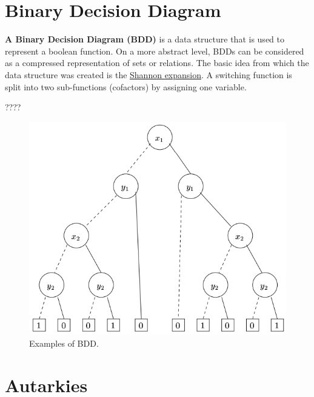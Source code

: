 \documentclass[12pt]{book}
\begin{document}
\section{Binary Decision Diagram}
\label{sec:Binary Decision Diagram}
\begin{defi}\label{def:bdd} \textbf{A Binary Decision Diagram (BDD)} is a data structure that is used to represent a boolean function. 
On a more abstract level, BDDs can be considered as a compressed representation of sets or relations. 
The basic idea from which the data structure was created is the \href{https://en.wikipedia.org/wiki/Boole%27s_expansion_theorem}{Shannon expansion}. A switching function is split into two sub-functions (cofactors) by assigning one variable. 
\end{defi} 
\begin{examp}\label{exp:bdd}
????
\end{examp}
\begin{figure}
	\centering
       \includegraphics[scale =0.7]{p4.png}
       \caption{Examples of BDD.}
  \end{figure}

\section{Autarkies}
\label{sec:Autarkies}
\end{document}
